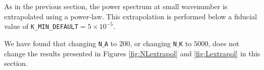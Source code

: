 \documentclass[\docopts]{\docclass}
\begin{document}
As in the previous section, the power spectrum at small wavenumber is extrapolated using a power-law. This extrapolation is performed below a fiducial value of {\tt K\_MIN\_DEFAULT}$=5\times 10^{-5}$.

We have found that changing {\tt N$\_$A} to $200$, or changing {\tt N$\_$K} to $5000$, does not change the results presented in Figures \ref{fig:NLextrapol} and \ref{fig:Lextrapol} in this section.


\end{document}
